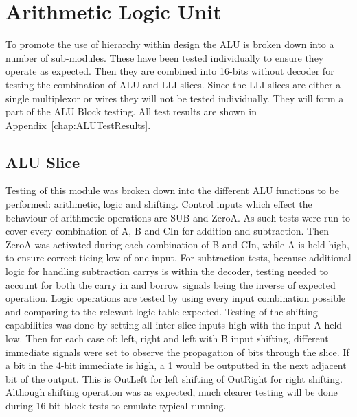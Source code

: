 
\section{Arithmetic Logic Unit}
To promote the use of hierarchy within design the ALU is broken down into a number of sub-modules. These have been tested individually to ensure they operate as expected. Then they are combined into 16-bits without decoder for testing the combination of ALU and LLI slices. Since the LLI slices are either a single multiplexor or wires they will not be tested individually. They will form a part of the ALU Block testing. All test results are shown in Appendix~\ref{chap:ALUTestResults}.

\subsection{ALU Slice}
Testing of this module was broken down into the different ALU functions to be performed: arithmetic, logic and shifting. Control inputs which effect the behaviour of arithmetic operations are SUB and ZeroA. As such tests were run to cover every combination of A, B and CIn for addition and subtraction. Then ZeroA was activated during each combination of B and CIn, while A is held high, to ensure correct tieing low of one input. 
For subtraction tests, because additional logic for handling subtraction carrys is within the decoder, testing needed to account for both the carry in and borrow signals being the inverse of expected operation.
Logic operations are tested by using every input combination possible and comparing to the relevant logic table expected.
Testing of the shifting capabilities was done by setting all inter-slice inputs high with the input A held low. Then for each case of: left, right and left with B input shifting, different immediate signals were set to observe the propagation of bits through the slice. If a bit in the 4-bit immediate is high, a 1 would be outputted in the next adjacent bit of the output. This is OutLeft for left shifting of OutRight for right shifting.
Although shifting operation was as expected, much clearer testing will be done during 16-bit block tests to emulate typical running. 

